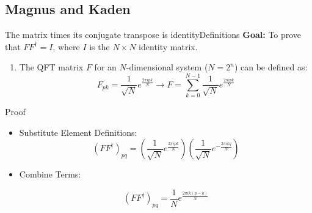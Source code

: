 {\subsection*{Magnus and Kaden}
\begin{frame}{The matrix times its conjugate transpose is identity}{Definitions}
\textbf{Goal:} To prove that $F F^\dagger = I$, where $I$ is the $N \times N$ identity matrix.
\begin{enumerate}
    \item The QFT matrix $F$ for an $N$-dimensional system ($N = 2^n$) can be defined as:
    \[
    F_{pk} = \frac{1}{\sqrt{N}} e^{\frac{2\pi i pk}{N}} \rightarrow
    F = \sum_{k=0}^{N-1} \frac{1}{\sqrt{N}} e^{\frac{2\pi i pk}{N}}
    \]
\end{enumerate}

\end{frame}

\begin{frame}{Proof}

    \begin{itemize}
        
        \item<1-2> Substitute Element Definitions:
        \[
        (F F^\dagger)_{pq} =  \left( \frac{1}{\sqrt{N}} e^{\frac{2\pi i pk}{N}} \right) \left( \frac{1}{\sqrt{N}} e^{-\frac{2\pi i kq}{N}} \right)
        \]
        
        
        \item<2> Combine Terms:
        
    
        \[
        (F F^\dagger)_{pq} = \frac{1}{N} e^{\frac{2\pi i k (p-q)}{N}}
        \]
        

\end{itemize}
\end{frame}}
